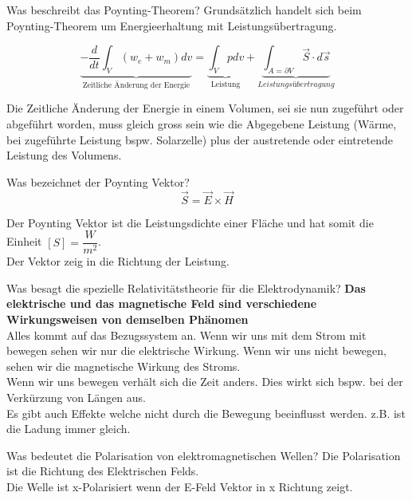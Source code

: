 
\begin{karte}{Was beschreibt das Poynting-Theorem?}
	Grundsätzlich handelt sich beim Poynting-Theorem um Energieerhaltung mit Leistungsübertragung.
	
	\begin{equation*}
	\underbrace{-\frac{d}{d t} \int_{V}\left(w_{e}+w_{m}\right) d v}_{\text{ Zeitliche Änderung der Energie }}
	=
	\underbrace{\int_{V} p d v}_{\text{Leistung}}
	+
	\underbrace{\int_{A=\partial V} \vec{S} \cdot d \vec{s}}_{Leistungsübertragung}
	\end{equation*}
	
	Die Zeitliche Änderung der Energie in einem Volumen, sei sie nun zugeführt oder abgeführt worden, muss gleich gross sein wie die Abgegebene Leistung (Wärme, bei zugeführte Leistung bspw. Solarzelle) plus der austretende oder eintretende Leistung des Volumens.
\end{karte}

\begin{karte}{Was bezeichnet der Poynting Vektor?}
	\begin{equation*}
	\vec{S}=\vec{E} \times \vec{H}
	\end{equation*}
	
	Der Poynting Vektor ist die Leistungsdichte einer Fläche und hat somit die Einheit $[S] = \dfrac{W}{m^2}$.\\
	Der Vektor zeig in die Richtung der Leistung.\\[5pt]
\end{karte}

\begin{karte}{Was besagt die spezielle Relativitätstheorie für die Elektrodynamik?}
	\textbf{Das elektrische und das magnetische Feld sind verschiedene Wirkungsweisen von demselben Phänomen}\\
	Alles kommt auf das Bezugssystem an. Wenn wir uns mit dem Strom mit bewegen sehen wir nur die elektrische Wirkung. Wenn wir uns nicht bewegen, sehen wir die magnetische Wirkung des Stroms.\\
	Wenn wir uns bewegen verhält sich die Zeit anders. Dies wirkt sich bspw. bei der Verkürzung von Längen aus.\\
	Es gibt auch Effekte welche nicht durch die Bewegung beeinflusst werden. z.B. ist die Ladung immer gleich.
\end{karte}

\begin{karte}{Was bedeutet die Polarisation von elektromagnetischen Wellen?}
	Die Polarisation ist die Richtung des Elektrischen Felds.\\
	Die Welle ist x-Polarisiert wenn der E-Feld Vektor in x Richtung zeigt.\\
	
\end{karte}

